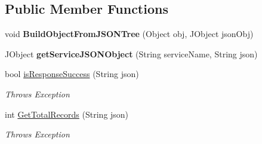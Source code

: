 \subsection*{Public Member Functions}
\begin{DoxyCompactItemize}
\item 
\hypertarget{classcom_1_1shephertz_1_1app42_1_1paas_1_1sdk_1_1windows_1_1_app42_response_builder_a1fd9273779a834f50044163ce80ec403}{void {\bfseries Build\+Object\+From\+J\+S\+O\+N\+Tree} (Object obj, J\+Object json\+Obj)}\label{classcom_1_1shephertz_1_1app42_1_1paas_1_1sdk_1_1windows_1_1_app42_response_builder_a1fd9273779a834f50044163ce80ec403}

\item 
\hypertarget{classcom_1_1shephertz_1_1app42_1_1paas_1_1sdk_1_1windows_1_1_app42_response_builder_acd2dee2c45125d654a706f82a4b8210d}{J\+Object {\bfseries get\+Service\+J\+S\+O\+N\+Object} (String service\+Name, String json)}\label{classcom_1_1shephertz_1_1app42_1_1paas_1_1sdk_1_1windows_1_1_app42_response_builder_acd2dee2c45125d654a706f82a4b8210d}

\item 
bool \hyperlink{classcom_1_1shephertz_1_1app42_1_1paas_1_1sdk_1_1windows_1_1_app42_response_builder_a2123ad3c7a7a325e3a8de142cb397a4a}{is\+Response\+Success} (String json)
\begin{DoxyCompactList}\small\item\em Throws Exception \end{DoxyCompactList}\item 
int \hyperlink{classcom_1_1shephertz_1_1app42_1_1paas_1_1sdk_1_1windows_1_1_app42_response_builder_a50eedcbc4e5814cbe3135b898de0ed35}{Get\+Total\+Records} (String json)
\begin{DoxyCompactList}\small\item\em Throws Exception \end{DoxyCompactList}\end{DoxyCompactItemize}



